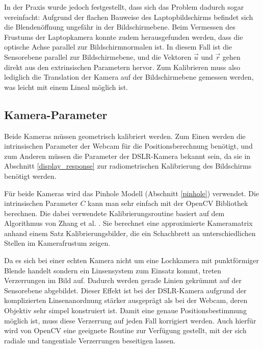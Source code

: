     In der Praxis wurde jedoch festgestellt, dass sich das Problem dadurch sogar vereinfacht:
    Aufgrund der flachen Bauweise des Laptopbildschirms befindet sich die Blendenöffnung ungefähr in der Bildschirmebene.
    Beim Vermessen des Frustums der Laptopkamera konnte zudem herausgefunden werden, dass die optische Achse parallel zur Bildschirmnormalen ist.
    In diesem Fall ist die Sensorebene parallel zur Bildschirmebene, und die Vektoren $\vec{u}$ und $\vec{r}$  gehen direkt aus den  extrinsischen Parametern hervor.
    Zum Kalibrieren muss also lediglich die Translation der Kamera auf der Bildschirmebene gemessen werden, was leicht mit einem Lineal möglich ist.
    
  \subsection{Kamera-Parameter} \label{kamera_parameter}

    Beide Kameras müssen geometrisch kalibriert werden.
    Zum Einen werden die intrinsischen Parameter der Webcam für die Positionsberechnung benötigt, und zum 
     Anderen müssen die Parameter der DSLR-Kamera bekannt sein, da sie in Abschnitt \ref{display_response} zur radiometrischen Kalibrierung des Bildschirms benötigt werden.

    Für beide Kameras wird das Pinhole Modell (Abschnitt \ref{pinhole}) verwendet.
    Die intrinsischen Parameter $C$ kann man sehr einfach mit der OpenCV Bibliothek \cite{opencv} berechnen.
    Die dabei verwendete Kalibrierungsroutine basiert auf dem Algorithmus von Zhang et al. \cite{Zhang_2000}.
    Sie berechnet eine approximierte Kameramatrix anhand einem Satz Kalibrierungsbilder, die ein Schachbrett an unterschiedlichen Stellen im Kamerafrustum zeigen.
     
   Da es sich bei einer echten Kamera nicht um eine Lochkamera mit punktförmiger Blende handelt sondern ein Linsensystem zum Einsatz kommt, treten Verzerrungen im Bild auf.
   Dadurch werden gerade Linien gekrümmt auf der Sensorebene abgebildet.
   Dieser Effekt ist bei der  DSLR-Kamera aufgrund der komplizierten Linsenanordnung stärker ausgeprägt als bei der Webcam, deren Objektiv sehr simpel konstruiert ist.
   Damit eine genaue Positionsbestimmung möglich ist, muss diese Verzerrung auf jeden Fall korrigiert werden.
   Auch hierfür wird von OpenCV eine geeignete Routine zur Verfügung gestellt, mit der sich radiale und tangentiale Verzerrungen beseitigen lassen.
   
